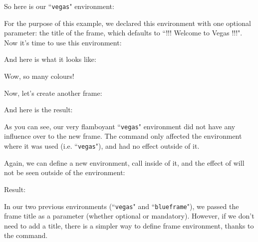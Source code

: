 So here is our ``\texttt{vegas}" environment:



For the purpose of this example, we declared this environment with one optional parameter: the title of the frame, which defaults to ``!!! Welcome to Vegas !!!". \\

Now it's time to use this environment:


And here is what it looks like: \\


\bigskip

Wow, so many colours! \\


\bigskip

Now, let's create another frame:


And here is the result:



As you can see, our very flamboyant ``\texttt{vegas}" environment did not have any influence over to the new frame. The  command only affected the environment where it was used (i.e. ``\texttt{vegas}"), and had no effect outside of it. \\

\bigskip


Again, we can define a new environment, call  inside of it, and the effect of  will not be seen outside of the environment:







Result:



\bigskip

In our two previous environments (``\texttt{vegas}" and ``\texttt{blueframe}"), we passed the frame title as a parameter (whether optional or mandatory). However, if we don't need to add a title, there is a simpler way to define frame environment, thanks to the  command. \\


